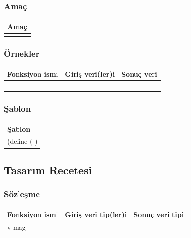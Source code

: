 \documentclass[12pt, a4paper]{article}
\newcommand\fillin[1][3cm]{\makebox[#1]{\dotfill}}
\begin{document}
\subsubsection*{Amaç}
\begin{tabular}{| p{17cm} |  }
\hline			
Amaç\\
\hline
 \\[10ex]
\hline  
\end{tabular}

\subsubsection*{Örnekler}
\begin{tabular}{| p{4cm} | p{8cm} | p{4cm} |  }
\hline			
Fonksiyon ismi&Giriş veri(ler)i&Sonuç veri\\
\hline
& & \\[6ex]
\hline  
& & \\[6ex]
\hline  
& & \\[6ex]
\hline  
& & \\[6ex]
\hline  
\end{tabular}

\subsubsection*{Şablon}
\begin{tabular}{| p{17cm} |  }
\hline			
Şablon\\
\hline
\vspace{0,5cm}
\vspace{0,2cm}
(define (\fillin[2cm] \hspace{1cm}  \fillin[8cm] ) \\[30ex]
\hline  
\end{tabular}






\newpage
\subsection*{Tasarım Recetesi}
\subsubsection*{Sözleşme}
\begin{tabular}{| p{4cm} | p{8cm} | p{4cm} |  }
\hline			
Fonksiyon ismi&Giriş veri tip(ler)i&Sonuç veri tipi\\
\hline
v-mag& & \\[10ex]
\hline  
\end{tabular}
\end{document}

